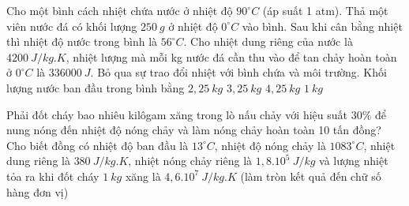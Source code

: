 \begin{ex} 
	Cho một bình cách nhiệt chứa nước ở nhiệt độ $90^\circ C$ (áp suất 1 atm). Thả một viên nước đá có khối lượng $250 \ g$ ở nhiệt độ $0^\circ C$ vào bình. Sau khi cân bằng nhiệt thì nhiệt độ nước trong bình là $56^\circ C$. Cho nhiệt dung riêng của nước là $4200 \ J/kg . K$, nhiệt lượng mà mỗi kg nước đá cần thu vào để tan chảy hoàn toàn ở $0^\circ C$ là $336000 \ J$. Bỏ qua sự trao đổi nhiệt với bình chứa và môi trường. Khối lượng nước ban đầu trong bình bằng 
	\choice
	{$2,25 \ kg$}
	{$3,25 \ kg$}
	{$4,25 \ kg$}
	{\True $1 \ kg$}
\end{ex}

 

\begin{ex}
	Phải đốt cháy bao nhiêu kilôgam xăng trong lò nấu chảy với hiệu suất $30 \%$ để nung nóng đến nhiệt độ nóng chảy và làm nóng chảy hoàn toàn 10 tấn đồng? Cho biết đồng có nhiệt độ ban đầu là $13^\circ C$, nhiệt độ nóng chảy là $1083^\circ C$, nhiệt dung riêng là $380 \ J / kg . K$, nhiệt nóng chảy riêng là $1,8 . 10^{5} \ J / kg$ và lượng nhiệt tỏa ra khi đốt cháy $1 \ kg$ xăng là $4,6 . 10^{7} \ J / kg . K$ (làm tròn kết quả đến chữ số hàng đơn vị)
	\end{ex}


